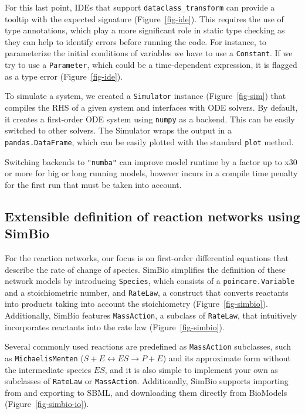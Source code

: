 \documentclass[
  letterpaper,
  DIV=11,
  numbers=noendperiod]{scrartcl}
\begin{document}


For this last point, \acp{IDE} that support \texttt{dataclass\_transform} \cite{debontePEP681Data2021}
can provide a tooltip with the expected signature
(Figure~\ref{fig-ide}). This requires the use of type
annotations, which play a more significant role in static type checking
as they can help to identify errors before running the code. For
instance, to parameterize the initial conditions of variables we have to
use a \texttt{Constant}. If we try to use a \texttt{Parameter}, which
could be a time-dependent expression, it is flagged as a type error
(Figure~\ref{fig-ide}).

To simulate a system, we created a \texttt{Simulator} instance
(Figure~\ref{fig-sim}) that compiles the \ac{RHS} of a given system and interfaces
with \ac{ODE} solvers. By default, it creates a first-order
\ac{ODE} system using \texttt{numpy} as a backend. This can be
easily switched to other solvers. The Simulator wraps the output in a
\texttt{pandas.DataFrame}, which can be easily plotted with the standard
\texttt{plot} method.

Switching backends to \texttt{"numba"} can improve model runtime by a
factor up to x30 or more for big or long running models, however incurs
in a compile time penalty for the first run that must be taken into
account.

\hypertarget{extensible-definition-of-reaction-networks-using-simbio}{%
\subsection{Extensible definition of reaction networks using
SimBio}\label{extensible-definition-of-reaction-networks-using-simbio}}

For the reaction networks, our focus is on first-order differential
equations that describe the rate of change of species. SimBio simplifies
the definition of these network models by introducing \texttt{Species},
which consists of a \texttt{poincare.Variable} and a stoichiometric
number, and \texttt{RateLaw}, a construct that converts reactants into
products taking into account the stoichiometry
(Figure~\ref{fig-simbio}). Additionally, SimBio features
\texttt{MassAction}, a subclass of \texttt{RateLaw}, that intuitively
incorporates reactants into the rate law (Figure~\ref{fig-simbio}).

Several commonly used reactions are predefined as \texttt{MassAction}
subclasses, such as \texttt{MichaelisMenten}
(\(S + E \leftrightarrow ES \rightarrow P + E\)) and its approximate
form without the intermediate species \(ES\), and it is also simple to
implement your own as subclasses of \texttt{RateLaw} or
\texttt{MassAction}. Additionally, SimBio supports importing from and
exporting to \ac{SBML}, and downloading them directly from BioModels
\cite{malik-sheriffBioModels15Years2020} (Figure~\ref{fig-simbio-io}).
\end{document}
